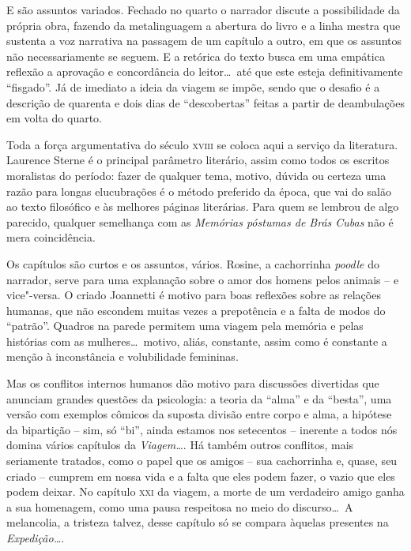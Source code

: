 E são assuntos variados. Fechado no quarto o narrador discute a
possibilidade da própria obra, fazendo da metalinguagem a abertura do
livro e a linha mestra que sustenta a voz narrativa na passagem de um
capítulo a outro, em que os assuntos não necessariamente se seguem. E a
retórica do texto busca em uma empática reflexão a aprovação e
concordância do leitor\ldots\ até que este esteja definitivamente
``fisgado''. Já de imediato a ideia da viagem se impõe, sendo que o
desafio é a descrição de quarenta e dois dias de ``descobertas'' feitas a
partir de deambulações em volta do quarto. 

Toda a força argumentativa do século \textsc{xviii} se coloca aqui a serviço da
literatura. Laurence Sterne é o principal parâmetro literário, assim
como todos os escritos moralistas do período: fazer de qualquer tema,
motivo, dúvida ou certeza uma razão para longas elucubrações é o método
preferido da época, que vai do salão ao texto filosófico e às melhores
páginas literárias. Para quem se lembrou de algo parecido, qualquer
semelhança com as \textit{Memórias póstumas de Brás Cubas} não é mera
coincidência.

Os capítulos são curtos e os assuntos, vários. Rosine, a cachorrinha
\textit{poodle} do narrador, serve para uma explanação sobre o amor dos homens
pelos animais -- e vice"-versa. O criado Joannetti é motivo para boas
reflexões sobre as relações humanas, que não escondem muitas vezes a
prepotência e a falta de modos do ``patrão''. Quadros na parede permitem
uma viagem pela memória e pelas histórias com as mulheres\ldots\ motivo,
aliás, constante, assim como é constante a menção à inconstância e volubilidade femininas. 

Mas os conflitos internos humanos dão motivo para discussões divertidas
que anunciam grandes questões da psicologia: a teoria da ``alma'' e da
``besta'', uma versão com exemplos cômicos da suposta divisão entre corpo
e alma, a hipótese da bipartição -- sim,  só ``bi'', ainda estamos nos
setecentos -- inerente a todos nós domina vários capítulos da
\textit{Viagem\ldots}. Há também outros conflitos, mais seriamente
tratados, como o papel que os amigos -- sua cachorrinha e, quase, seu
criado -- cumprem em nossa vida  e a falta que eles podem fazer, o vazio
que eles podem deixar. No capítulo \textsc{xxi} da viagem, a morte de um
verdadeiro amigo ganha a sua homenagem, como uma pausa respeitosa no
meio do discurso\ldots\ A melancolia, a tristeza talvez, desse capítulo só
se compara àquelas presentes na \textit{Expedição\ldots}. 

